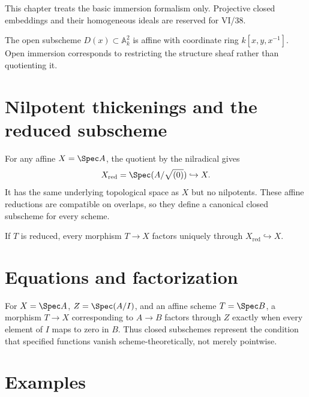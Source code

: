 \begin{remark}
This chapter treats the basic immersion formalism only.  Projective closed embeddings and their
homogeneous ideals are reserved for VI/38.
\end{remark}



\begin{example}\label{ex:vi22-expand-03}
The open subscheme $D(x)\subset\mathbb A^2_k$ is affine with coordinate ring $k[x,y,x^{-1}]$.  Open immersion corresponds to restricting the structure sheaf rather than quotienting it.
\end{example}
\section{Nilpotent thickenings and the reduced subscheme}
For any affine $X=\Spec A$, the quotient by the nilradical gives
\[
 X_{\mathrm{red}}=\Spec(A/\sqrt{(0)})\hookrightarrow X.
\]
It has the same underlying topological space as $X$ but no nilpotents.  These affine reductions
are compatible on overlaps, so they define a canonical closed subscheme for every scheme.

\begin{proposition}\label{prop:vi22-reduction-universal}
If $T$ is reduced, every morphism $T\to X$ factors uniquely through
$X_{\mathrm{red}}\hookrightarrow X$.
\end{proposition}



\section{Equations and factorization}
For $X=\Spec A$, $Z=\Spec(A/I)$, and an affine scheme $T=\Spec B$, a morphism
$T\to X$ corresponding to $A\to B$ factors through $Z$ exactly when every element of $I$
maps to zero in $B$.  Thus closed subschemes represent the condition that specified functions
vanish scheme-theoretically, not merely pointwise.

\section{Examples}



